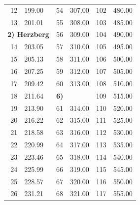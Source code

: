 \documentclass[a4paper,twoside]{article}
\begin{document}
\begin{table}[tbh]
\begin{center}
\begin{tabular}{|rp{}|rp{}|rp{}|}
       12 & 199.00                                &  54 & 307.00                      & 102 & 480.00                          \\
       13 & 201.01                                &  55 & 308.00                      & 103 & 485.00                          \\\cline{1-2}
      \multicolumn{2}{|l|}{\bf 2) Herzberg}       &  56 & 309.00                      & 104 & 490.00                          \\\cline{1-2}
       14 & 203.05                                &  57 & 310.00                      & 105 & 495.00                          \\
       15 & 205.13                                &  58 & 311.00                      & 106 & 500.00                          \\
       16 & 207.25                                &  59 & 312.00                      & 107 & 505.00                          \\
       17 & 209.42                                &  60 & 313.00                      & 108 & 510.00                          \\\cline{3-4}
       18 & 211.64                                & \multicolumn{2}{|l|}{\bf 6)}      & 109 & 515.00                          \\\cline{3-4}
       19 & 213.90                                &  61 & 314.00                      & 110 & 520.00                          \\
       20 & 216.22                                &  62 & 315.00                      & 111 & 525.00                          \\
       21 & 218.58                                &  63 & 316.00                      & 112 & 530.00                          \\
       22 & 220.99                                &  64 & 317.00                      & 113 & 535.00                          \\
       23 & 223.46                                &  65 & 318.00                      & 114 & 540.00                          \\
       24 & 225.99                                &  66 & 319.00                      & 115 & 545.00                          \\
       25 & 228.57                                &  67 & 320.00                      & 116 & 550.00                          \\
       26 & 231.21                                &  68 & 321.00                      & 117 & 555.00                          \\

\end{tabular}
\end{center}
\end{table}
\end{document}
